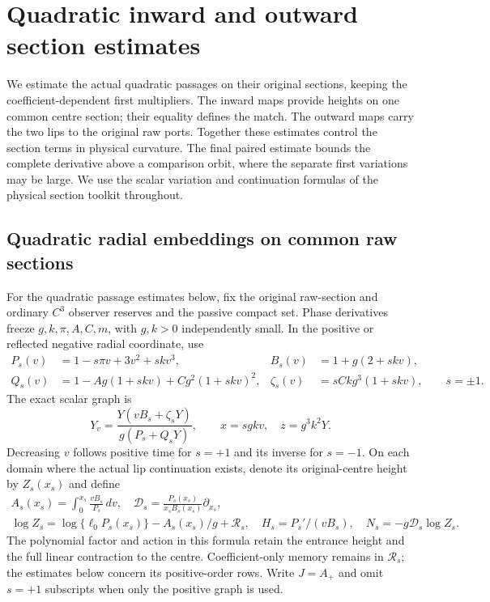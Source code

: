 \section{Quadratic inward and outward section estimates}
\label{app:moving-section-bookkeeping}

We estimate the actual quadratic passages on their original sections,
keeping the coefficient-dependent first multipliers. The inward maps
provide heights on one common centre section; their equality defines the
match. The outward maps carry the two lips to the original raw ports.
Together these estimates control the section terms in physical curvature.
The final paired estimate bounds the complete derivative above a
comparison orbit, where the separate first variations may be large.
We use the scalar variation and continuation formulas of the physical
section toolkit throughout.

\subsection{Quadratic radial embeddings on common raw sections}

For the quadratic passage estimates below, fix the original raw-section and
ordinary \(C^3\) observer reserves and the passive compact set.
Phase derivatives freeze \(g,k,\pi,A,C,m\), with \(g,k>0\) independently
small. In the positive or reflected negative radial coordinate, use
\begin{equation}\label{deg:quadratic-inward-family}
 \begin{aligned}
 P_s(v)&=1-s\pi v+3v^2+skv^3,& B_s(v)&=1+g(2+skv),\\
 Q_s(v)&=1-Ag(1+skv)+Cg^2(1+skv)^2,&
 \zeta_s(v)&=sCkg^3(1+skv),\qquad s=\pm1.
 \end{aligned}
\end{equation}
The exact scalar graph is
\begin{equation}\label{deg:quadratic-inward-scalar-common}
 Y_v=\frac{Y(vB_s+\zeta_sY)}{g(P_s+Q_sY)},
 \qquad x=sgkv,\quad z=g^3k^2Y.
\end{equation}
Decreasing \(v\) follows positive time for \(s=+1\) and its inverse
for \(s=-1\). On each domain where the actual lip continuation
exists, denote its original-centre height by \(Z_s(x_s)\) and define
\begin{equation}\label{deg:quadratic-inward-memory-common}
 \begin{gathered}
 A_s(x_s)=\int_0^{x_s}\frac{vB_s}{P_s}\,dv,\quad
 \mathcal D_s=\frac{P_s(x_s)}{x_sB_s(x_s)}\partial_{x_s},\\
 \log Z_s=\log\{\ell_0P_s(x_s)\}-A_s(x_s)/g+\mathcal R_s,
 \quad H_s=P_s'/(vB_s),\quad N_s=-g\mathcal D_s\log Z_s .
 \end{gathered}
\end{equation}
The polynomial factor and action in this formula retain the entrance
height and the full linear contraction to the centre.
Coefficient-only memory remains in \(\mathcal R_s\); the estimates
below concern its positive-order rows. Write \(J=A_+\) and omit
\(s=+1\) subscripts when only the positive graph is used.

